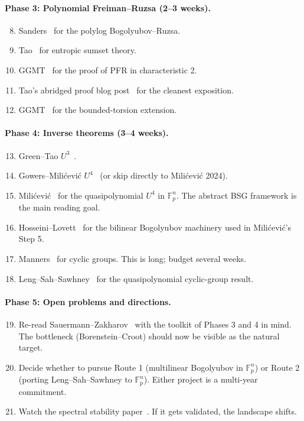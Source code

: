 \documentclass[11pt,a4paper]{article}
\theoremstyle{plain}
\theoremstyle{definition}
\theoremstyle{remark}
\newcommand{\F}{\mathbb{F}}
\begin{document}
\paragraph{Phase 3: Polynomial Freiman--Ruzsa (2--3 weeks).}
\begin{enumerate}[leftmargin=2em]
\setcounter{enumi}{7}
  \item Sanders~\cite{sanders2012} for the polylog Bogolyubov--Ruzsa.
  \item Tao~\cite{tao2010} for entropic sumset theory.
  \item GGMT~\cite{ggmt2023} for the proof of PFR in characteristic 2.
  \item Tao's abridged proof blog post~\cite{tao2024abridged} for the cleanest exposition.
  \item GGMT~\cite{ggmt2024} for the bounded-torsion extension.
\end{enumerate}

\paragraph{Phase 4: Inverse theorems (3--4 weeks).}
\begin{enumerate}[leftmargin=2em]
\setcounter{enumi}{12}
  \item Green--Tao $U^3$~\cite{greentao2008}.
  \item Gowers--Mili\'cevi\'c $U^4$~\cite{gowersmilicevic2017} (or skip directly to Mili\'cevi\'c 2024).
  \item Mili\'cevi\'c~\cite{milicevic2024} for the quasipolynomial $U^4$ in $\F_p^n$. The abstract BSG framework is the main reading goal.
  \item Hosseini--Lovett~\cite{hosseinilovett2019} for the bilinear Bogolyubov machinery used in Mili\'cevi\'c's Step 5.
  \item Manners~\cite{manners2018} for cyclic groups. This is long; budget several weeks.
  \item Leng--Sah--Sawhney~\cite{lengsahsawhney2024} for the quasipolynomial cyclic-group result.
\end{enumerate}

\paragraph{Phase 5: Open problems and directions.}
\begin{enumerate}[leftmargin=2em]
\setcounter{enumi}{18}
  \item Re-read Sauermann--Zakharov~\cite{sauermannzakharov2023} with the toolkit of Phases 3 and 4 in mind. The bottleneck (Borenstein--Croot) should now be visible as the natural target.
  \item Decide whether to pursue Route 1 (multilinear Bogolyubov in $\F_p^n$) or Route 2 (porting Leng--Sah--Sawhney to $\F_p^n$). Either project is a multi-year commitment.
  \item Watch the spectral stability paper~\cite{kazemi2025}. If it gets validated, the landscape shifts.
\end{enumerate}
\end{document}
